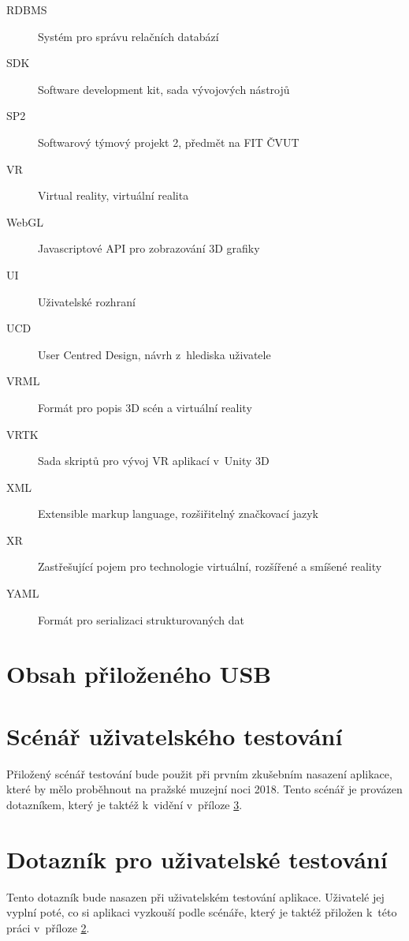 \documentclass[thesis=B,czech]{FITthesis}[2012/06/26]
\begin{document}
\begin{description}
	\item[RDBMS] Systém pro správu relačních databází
	\item[SDK] Software development kit, sada vývojových nástrojů 
	\item[SP2] Softwarový týmový projekt 2, předmět na FIT ČVUT
	\item[VR] Virtual reality, virtuální realita
    \item[WebGL] Javascriptové API pro zobrazování 3D grafiky
    \item[UI] Uživatelské rozhraní
    \item[UCD] User Centred Design, návrh z~hlediska uživatele
    \item[VRML] Formát pro popis 3D scén a virtuální reality
    \item[VRTK] Sada skriptů pro vývoj VR aplikací v~Unity 3D
	\item[XML] Extensible markup language, rozšiřitelný značkovací jazyk
	\item[XR] Zastřešující pojem pro technologie virtuální, rozšířené a smíšené reality
	\item[YAML] Formát pro serializaci strukturovaných dat
\end{description}


\chapter{Obsah přiloženého USB}


\begin{figure}
\end{figure}

\chapter{Scénář uživatelského testování} \label{sec:scenar}
Přiložený scénář testování bude použit při prvním zkušebním nasazení aplikace, které by mělo proběhnout na pražské muzejní noci 2018. Tento scénář je provázen dotazníkem, který je taktéž k~vidění v~příloze \ref{sec:dotaznik}.

\chapter{Dotazník pro uživatelské testování} \label{sec:dotaznik}
Tento dotazník bude nasazen při uživatelském testování aplikace. Uživatelé jej vyplní poté, co si aplikaci vyzkouší podle scénáře, který je taktéž přiložen k~této práci v~příloze \ref{sec:scenar}.


  
\end{document}
